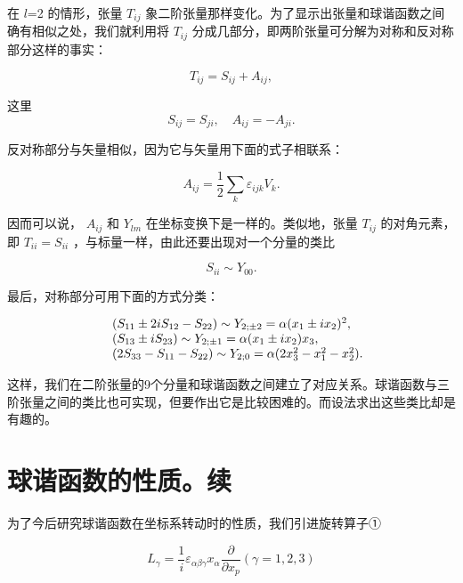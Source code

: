在 $l$=2 的情形，张量 $T_{ij}$ 象二阶张量那样变化。为了显示出张量和球谐函数之间确有相似之处，我们就利用将 $T_{ij}$ 分成几部分，即两阶张量可分解为对称和反对称部分这样的事实：

\begin{equation*}
T _ {i j} = S _ {i j} + A _ {i j},
\end{equation*}

这里
\begin{equation*}
S _ {i j} = S _ {j i}, \quad A _ {i j} = - A _ {j i}.
\end{equation*}

反对称部分与矢量相似，因为它与矢量用下面的式子相联系：

\begin{equation*}
A _ {i j} = \frac {1}{2} \sum_ {k} \varepsilon_ {i j k} V _ {k}.
\end{equation*}

因而可以说， $A_{ij}$ 和 $Y_{lm}$ 在坐标变换下是一样的。类似地，张量 $T_{ij}$ 的对角元素，即 $T_{ii}=S_{ii}$ ，与标量一样，由此还要出现对一个分量的类比

\begin{equation*}
S _ {i i} \sim Y _ {0 0}.
\end{equation*}

最后，对称部分可用下面的方式分类：

\begin{equation*}
\begin{array}{r l} & (S _ {1 1} \pm 2 i S _ {1 2} - S _ {2 2}) \sim Y _ {2; \pm 2} = \alpha (x _ {1} \pm i x _ {2}) ^ {2}, \\ & (S _ {1 3} \pm i S _ {2 3}) \sim Y _ {2; \pm 1} = \alpha (x _ {1} \pm i x _ {2}) x _ {3}, \\ & (2 S _ {3 3} - S _ {1 1} - S _ {2 2}) \sim Y _ {2; 0} = \alpha (2 x _ {3} ^ {2} - x _ {1} ^ {2} - x _ {2} ^ {2}). \end{array}
\end{equation*}

这样，我们在二阶张量的9个分量和球谐函数之间建立了对应关系。球谐函数与三阶张量之间的类比也可实现，但要作出它是比较困难的。而设法求出这些类比却是有趣的。

\section{球谐函数的性质。续}

为了今后研究球谐函数在坐标系转动时的性质，我们引进旋转算子①

\begin{equation*}
L _ {\gamma} = \frac {1}{i} \varepsilon_ {\alpha \beta \gamma} x _ {\alpha} \frac {\partial}{\partial x _ {p}} (\gamma = 1, 2, 3)\tag{3.129}
\end{equation*}

